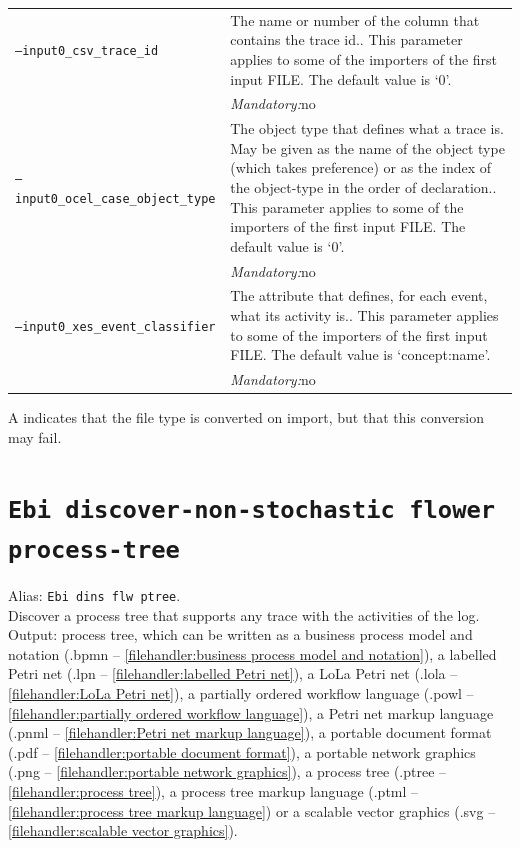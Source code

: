 {\begin{tabularx}{\linewidth}{lX}
\texttt{--input0\_csv\_trace\_id} & The name or number of the column that contains the trace id.. This parameter applies to some of the importers of the first input FILE. The default value is `0'.\\
&\textit{Mandatory:}\quad no\\
\texttt{--input0\_ocel\_case\_object\_type} & The object type that defines what a trace is. May be given as the name of the object type (which takes preference) or as the index of the object-type in the order of declaration.. This parameter applies to some of the importers of the first input FILE. The default value is `0'.\\
&\textit{Mandatory:}\quad no\\
\texttt{--input0\_xes\_event\_classifier} & The attribute that defines, for each event, what its activity is.. This parameter applies to some of the importers of the first input FILE. The default value is `concept:name'.\\
&\textit{Mandatory:}\quad no\\
\bottomrule
\end{tabularx}
A \textdagger{} indicates that the file type is converted on import, but that this conversion may fail.
\clearpage\section{\texttt{Ebi discover-non-stochastic flower process-tree}}
\label{command:Ebi discover-non-stochastic flower process-tree}
Alias: \texttt{Ebi dins flw ptree}.\\
Discover a process tree that supports any trace with the activities of the log.\\
\noindent Output: process tree, which can be written as a business process model and notation (.bpmn -- \cref{filehandler:business process model and notation}), a labelled Petri net (.lpn -- \cref{filehandler:labelled Petri net}), a LoLa Petri net (.lola -- \cref{filehandler:LoLa Petri net}), a partially ordered workflow language (.powl -- \cref{filehandler:partially ordered workflow language}), a Petri net markup language (.pnml -- \cref{filehandler:Petri net markup language}), a portable document format (.pdf -- \cref{filehandler:portable document format}), a portable network graphics (.png -- \cref{filehandler:portable network graphics}), a process tree (.ptree -- \cref{filehandler:process tree}), a process tree markup language (.ptml -- \cref{filehandler:process tree markup language}) or a scalable vector graphics (.svg -- \cref{filehandler:scalable vector graphics}).\\
}
